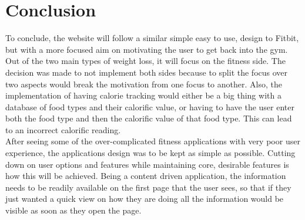 \section{Conclusion}
To conclude, the website will follow a similar simple easy to use, design to Fitbit, but with a more focused aim on motivating the user to get back into the gym. Out of the two main types of weight loss, it will focus on the fitness side. The decision was made to not implement both sides because to split the focus over two aspects would break the motivation from one focus to another. Also, the implementation of having calorie tracking would either be a big thing with a database of food types and their calorific value, or having to have the user enter both the food type and then the calorific value of that food type. This can lead to an incorrect calorific reading.\\

After seeing some of the over-complicated fitness applications with very poor user experience, the applications design was to be kept as simple as possible. Cutting down on user options and features while maintaining core, desirable features is how this will be achieved. Being a content driven application, the information needs to be readily available on the first page that the user sees, so that if they just wanted a quick view on how they are doing all the information would be visible as soon as they open the page.
